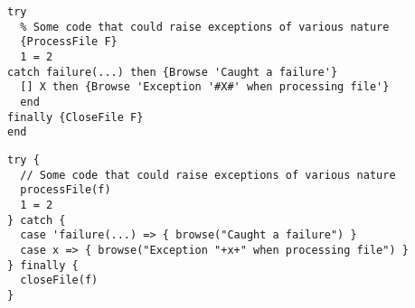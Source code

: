 \begin{lstlisting}[language=oz,label={lst:lstexampletryoz},title={File operations : an exception-prone program example (\textit{Oz} version)}]
try
  % Some code that could raise exceptions of various nature
  {ProcessFile F}
  1 = 2
catch failure(...) then {Browse 'Caught a failure'}
  [] X then {Browse 'Exception '#X#' when processing file'}
  end
finally {CloseFile F}
end
\end{lstlisting}
\begin{lstlisting}[language=newoz,label={lst:lstexampletrynewoz},title={File operations : an exception-prone program example (\textit{NewOz} version)}]
try {
  // Some code that could raise exceptions of various nature
  processFile(f)
  1 = 2
} catch {
  case 'failure(...) => { browse("Caught a failure") }
  case x => { browse("Exception "+x+" when processing file") }
} finally {
  closeFile(f)
}
\end{lstlisting}